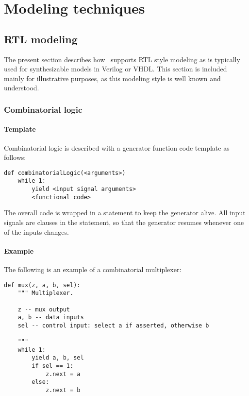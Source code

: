 \chapter{Modeling techniques \label{model}}

\section{RTL modeling \label{model-rtl}}
The present section describes how \myhdl\ supports RTL style modeling
as is typically used for synthesizable models in Verilog or VHDL. This
section is included mainly for illustrative purposes, as this modeling
style is well known and understood.

\subsection{Combinatorial logic \label{model-comb}}

\subsubsection{Template \label{model-comb-templ}}

Combinatorial logic is described with a generator function code template as
follows: 

\begin{verbatim}
def combinatorialLogic(<arguments>)
    while 1:
        yield <input signal arguments>
        <functional code>
\end{verbatim}

The overall code is wrapped in a  statement to keep the
generator alive. All input signals are clauses in the 
statement, so that the generator resumes whenever one of the inputs
changes. 

\subsubsection{Example \label{model-comb-ex}}

The following is an example of a combinatorial multiplexer:

\begin{verbatim}
def mux(z, a, b, sel):
    """ Multiplexer.
    
    z -- mux output
    a, b -- data inputs
    sel -- control input: select a if asserted, otherwise b

    """
    while 1:
        yield a, b, sel
        if sel == 1:
            z.next = a
        else:
            z.next = b
\end{verbatim}

